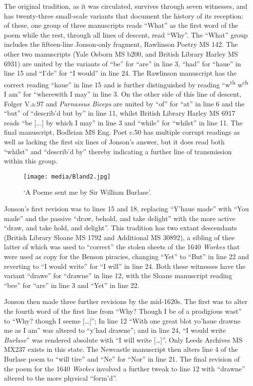 \begin{paper}
The original tradition, as it was circulated, survives through seven
witnesses, and has twenty-three small-scale variants that document the
history of its reception: of these, one group of three manuscripts reads
``What'' as the first word of the poem while the rest, through all lines
of descent, read ``Why''. The ``What'' group includes the fifteen-line
Jonson-only fragment, Rawlinson Poetry MS 142. The other two manuscripts
(Yale Osborn MS b200, and British Library Harley MS 6931) are united by the
variants of ``be'' for ``are'' in line 3, ``had'' for ``haue'' in line 15 and
``I'de'' for ``I would'' in line 24. The Rawlinson manuscript has the
correct reading ``haue'' in line 15 and is further distinguished by
reading ``w\textsuperscript{th} w\textsuperscript{ch} I am'' for
``wherewith I may'' in line 3. On the other side of this line of descent,
Folger V.a.97 and \emph{Parnassus Biceps} are united by ``of'' for ``at'' in
line 6 and the ``but'' of ``describ'd but by'' in line 11, whilst British
Library Harley MS 6917 reads ``be [...] by which I may'' in line 3 and
``while'' for ``whilst'' in line 11. The final manuscript, Bodleian MS Eng.
Poet c.50 has multiple corrupt readings as well as lacking the first six
lines of Jonson's answer, but it does read both ``whilst'' and ``describ'd
by'' thereby indicating a further line of transmission within this group.

\begin{sidewaysfigure}
    \centering
    \texttt{[image: media/Bland2.jpg]}
    \caption{`A Poeme sent me by Sir William Burlase'.}
    \label{fig:bland:poemestemma}
\end{sidewaysfigure}


Jonson's first revision was to lines 15 and 18, replacing ``Y'haue made''
with ``You made'' and the passive ``draw, behold, and take delight'' with
the more active ``draw, and take hold, and delight''. This tradition has
two extant descendants (British Library Sloane MS 1792 and Additional MS
30892), a sibling of thee latter of which was used to ``correct'' the
stolen sheets of the 1640 \emph{Workes} that were used as copy for the
Benson piracies, changing ``Yet'' to ``But'' in line 22 and reverting to ``I
would write'' for ``I will'' in line 24. Both these witnesses have the
variant ``drawe'' for ``drawne'' in line 12, with the Sloane manuscript
reading ``bee'' for ``are'' in line 3 and ``Yet'' in line 22.

Jonson then made three further revisions by the mid-1620s. The first was
to alter the fourth word of the first line from ``Why? Though I be of a
prodigious wast'' to ``Why? though I seeme {[}\ldots{}{]}''; In line 12 ``With one
great blot yo'haue drawne me as I am'' was altered to ``y'had drawne''; and
in line 24, ``I would write \emph{Burlase}'' was rendered absolute with ``I
will write {[}\ldots{}{]}''. Only Leeds Archives MS MX237 exists in this state.
The Newcastle manuscript then alters line 4 of the Burlase poem to ``will
tire'' and ``Ne'' for ``Nor'' in line 21. The final revision of the poem for
the 1640 \emph{Workes} involved a further tweak to line 12 with ``drawne''
altered to the more physical ``form'd''.


\end{paper}
